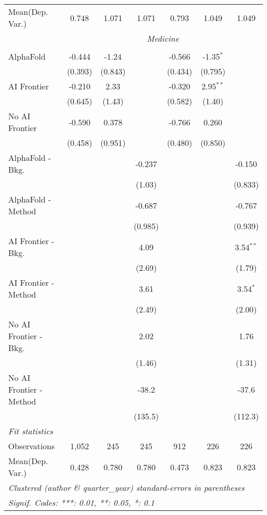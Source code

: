 \begin{tabular}{lcccccc}
Mean(Dep. Var.) & 0.748 & 1.071 & 1.071 & 0.793 & 1.049 & 1.049 \\
 & \multicolumn{6}{c}{\textit{Medicine}} \\ \\
   AlphaFold               & -0.444  & -1.24   &         & -0.566  & -1.35$^{*}$ &   \\   
                           & (0.393) & (0.843) &         & (0.434) & (0.795)     &   \\   
   AI Frontier             & -0.210  & 2.33    &         & -0.320  & 2.95$^{**}$ &   \\   
                           & (0.645) & (1.43)  &         & (0.582) & (1.40)      &   \\   
   No AI Frontier          & -0.590  & 0.378   &         & -0.766  & 0.260       &   \\   
                           & (0.458) & (0.951) &         & (0.480) & (0.850)     &   \\   
   AlphaFold - Bkg.        &         &         & -0.237  &         &             & -0.150\\   
                           &         &         & (1.03)  &         &             & (0.833)\\   
   AlphaFold - Method      &         &         & -0.687  &         &             & -0.767\\   
                           &         &         & (0.985) &         &             & (0.939)\\   
   AI Frontier - Bkg.      &         &         & 4.09    &         &             & 3.54$^{**}$\\   
                           &         &         & (2.69)  &         &             & (1.79)\\   
   AI Frontier - Method    &         &         & 3.61    &         &             & 3.54$^{*}$\\   
                           &         &         & (2.49)  &         &             & (2.00)\\   
   No AI Frontier - Bkg.   &         &         & 2.02    &         &             & 1.76\\   
                           &         &         & (1.46)  &         &             & (1.31)\\   
   No AI Frontier - Method &         &         & -38.2   &         &             & -37.6\\   
                           &         &         & (135.5) &         &             & (112.3)\\   
   \midrule
   \emph{Fit statistics}\\
   Observations            & 1,052   & 245     & 245     & 912     & 226         & 226\\  
Mean(Dep. Var.) & 0.428 & 0.780 & 0.780 & 0.473 & 0.823 & 0.823 \\
   \midrule \midrule
   \multicolumn{7}{l}{\emph{Clustered (author \& quarter\_year) standard-errors in parentheses}}\\
   \multicolumn{7}{l}{\emph{Signif. Codes: ***: 0.01, **: 0.05, *: 0.1}}\\
\end{tabular}
\par\endgroup
